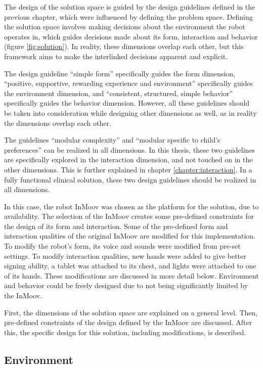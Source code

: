 The design of the solution space is guided by the design guidelines defined in the previous chapter, which were influenced by defining the problem space. Defining the solution space involves making decisions about the environment the robot operates in, which guides decisions made about its form, interaction and behavior (figure \ref{fig:solution}). In reality, these dimensions overlap each other, but this framework aims to make the interlinked decisions apparent and explicit.

The design guideline ``simple form'' specifically guides the form dimension, ``positive, supportive, rewarding experience and environment'' specifically guides the environment dimension, and ``consistent, structured, simple behavior'' specifically guides the behavior dimension. However, all these guidelines should be taken into consideration while designing other dimensions as well, as in reality the dimensions overlap each other. 

The guidelines ``modular complexity'' and ``modular specific to child's preferences'' can be realized in all dimensions. In this thesis, these two guidelines are specifically explored in the interaction dimension, and not touched on in the other dimensions. This is further explained in chapter \ref{chapter:interaction}. In a fully functional clinical solution, these two design guidelines should be realized in all dimensions.

In this case, the robot InMoov was chosen as the platform for the solution, due to availability. The selection of the InMoov creates some pre-defined constraints for the design of its form and interaction. Some of the pre-defined form and interaction qualities of the original InMoov are modified for this implementation. To modify the robot's form, its voice and sounds were modified from pre-set settings. To modify interaction qualities, new hands were added to give better signing ability, a tablet was attached to its chest, and lights were attached to one of its hands. These modifications are discussed in more detail below. Environment and behavior could be freely designed due to not being significantly limited by the InMoov.

First, the dimensions of the solution space are explained on a general level. Then, pre-defined constraints of the design defined by the InMoov are discussed. After this, the specific design for this solution, including modifications, is described. 


\subsection{Environment}

